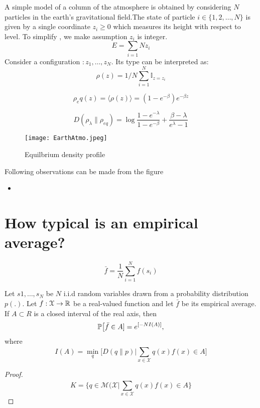 \documentclass[letterpaper,english,12pt]{article}
\begin{document}
 \begin{exmp}
 
 A simple model of a column of the atmosphere is obtained by considering $N$ particles in the earth's gravitational field.The state of particle $i \in \lbrace 1,2, \dots, N \rbrace $ is given by a single coordinate $z_i\geq 0$ which measures its height with respect to level. To simplify , we make assumption $z_i$ is integer.
 \begin{equation}
     E=\sum_{i=1}{N}z_i
 \end{equation}
 Consider a configuration $:{z_1,\dots,z_N}$. Its type can be interpreted as:
 \begin{equation}
   \rho(z) = \displaystyle 1/N\sum_{i=1}^{N}\mathds{I}_{z=z_i}  
 \end{equation}
 
 \begin{equation}
     \rho_eq(z)=\langle \rho(z) \rangle = (1-e^{-\beta})e^{-\beta z}
 \end{equation}
 
 \begin{equation}
     D(\rho_{\lambda} \parallel \rho_{eq}) = \log{  \frac{1-e^{-\lambda}}{1-e^{-\beta}}  + \frac{\beta -\lambda}{e^{\lambda}-1}}
 \end{equation}
 
 \begin{figure}[h!]
  \texttt{[image: EarthAtmo.jpeg]}
  \caption{Equilbrium density profile}
  \label{fig:Earthatmo}
\end{figure}
Following observations can be made from the figure 
\begin{itemize}
    \item 
\end{itemize}
 \end{exmp}
 \section{How typical is an empirical average?}
 \begin{equation}
     \bar{f} = \frac{1}{N}\sum_{i=1}^{N}f(s_i)
 \end{equation}
 \begin{cor}
 Let $s1,\dots ,s_N$ be $N$ i.i.d random variables drawn from a probability distribution $p(.)$. Let $f:\mathcal{X}\rightarrow \R$ be a real-valued  function and let $\bar{f}$ be its empirical average. If $A\subset R$ is a closed interval of the real axis, then 
 \begin{equation}
     \P\big[\bar{f}\in A]= e^{[-NI(A)]},
 \end{equation}
 where
 \begin{equation}
     I(A)=\min_q\big[D(q\parallel p)| \sum_{x\in\mathcal{X}}^{} q(x)f(x) \in A]
 \end{equation}
 \end{cor}
 \begin{proof}
 
 \begin{equation}
     K= \Big\{ q\in \mathcal{M}(\mathcal{X}|\sum_{x\in\mathcal{X}}^{} q(x)f(x) \in A \Big\}
 \end{equation}
 \end{proof}
 
\end{document}
